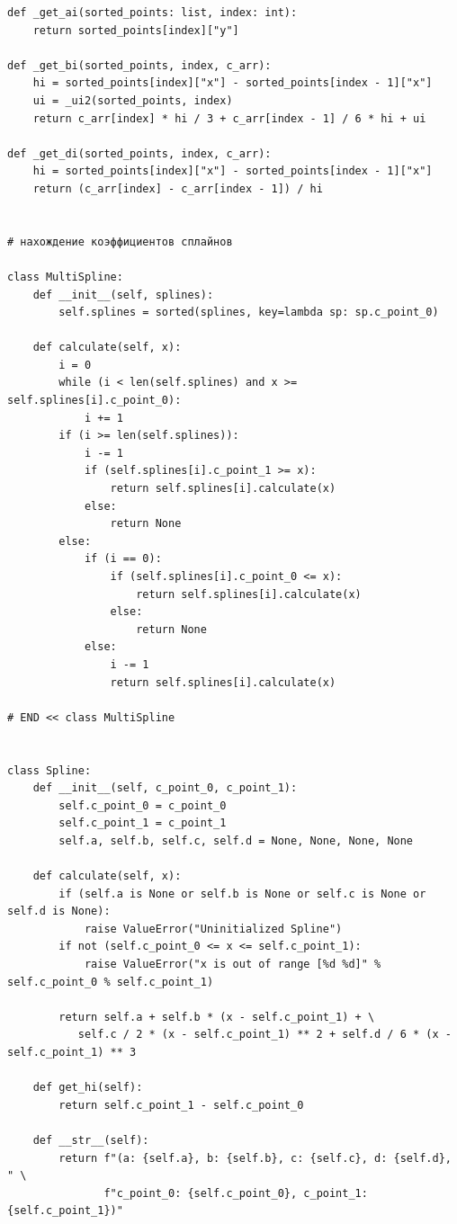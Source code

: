 \documentclass[11pt, a4paper]{article}
\begin{document}
\begin{Verbatim}[fontsize=\small]
def _get_ai(sorted_points: list, index: int):
    return sorted_points[index]["y"]

def _get_bi(sorted_points, index, c_arr):
    hi = sorted_points[index]["x"] - sorted_points[index - 1]["x"]
    ui = _ui2(sorted_points, index)
    return c_arr[index] * hi / 3 + c_arr[index - 1] / 6 * hi + ui

def _get_di(sorted_points, index, c_arr):
    hi = sorted_points[index]["x"] - sorted_points[index - 1]["x"]
    return (c_arr[index] - c_arr[index - 1]) / hi


# нахождение коэффициентов сплайнов 

class MultiSpline:
    def __init__(self, splines):
        self.splines = sorted(splines, key=lambda sp: sp.c_point_0)

    def calculate(self, x):
        i = 0
        while (i < len(self.splines) and x >= self.splines[i].c_point_0):
            i += 1
        if (i >= len(self.splines)):
            i -= 1
            if (self.splines[i].c_point_1 >= x):
                return self.splines[i].calculate(x)
            else:
                return None
        else:
            if (i == 0):
                if (self.splines[i].c_point_0 <= x):
                    return self.splines[i].calculate(x)
                else:
                    return None
            else:
                i -= 1
                return self.splines[i].calculate(x)

# END << class MultiSpline


class Spline:
    def __init__(self, c_point_0, c_point_1):
        self.c_point_0 = c_point_0
        self.c_point_1 = c_point_1
        self.a, self.b, self.c, self.d = None, None, None, None

    def calculate(self, x):
        if (self.a is None or self.b is None or self.c is None or self.d is None):
            raise ValueError("Uninitialized Spline")
        if not (self.c_point_0 <= x <= self.c_point_1):
            raise ValueError("x is out of range [%d %d]" % self.c_point_0 % self.c_point_1)

        return self.a + self.b * (x - self.c_point_1) + \
           self.c / 2 * (x - self.c_point_1) ** 2 + self.d / 6 * (x - self.c_point_1) ** 3

    def get_hi(self):
        return self.c_point_1 - self.c_point_0

    def __str__(self):
        return f"(a: {self.a}, b: {self.b}, c: {self.c}, d: {self.d}, " \
               f"c_point_0: {self.c_point_0}, c_point_1: {self.c_point_1})"


\end{Verbatim}
\end{document}
